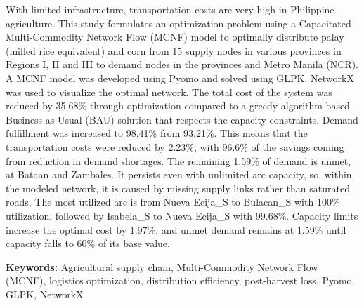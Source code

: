 \documentclass{icsthesis}
\begin{document}
\begin{frontmatter}
\begin{abstractwithpageno}
	With limited infrastructure, transportation costs are very high in Philippine agriculture. This study formulates an optimization problem using a Capacitated Multi-Commodity Network Flow (MCNF) model to optimally distribute palay (milled rice equivalent) and corn from 15 supply nodes in various provinces in Regions I, II and III to demand nodes in the provinces and Metro Manila (NCR). A MCNF model was developed using Pyomo and solved using GLPK. NetworkX was used to visualize the optimal network. The total cost of the system was reduced by 35.68\% through optimization compared to a greedy algorithm based Business-as-Usual (BAU) solution that respects the capacity constraints. Demand fulfillment was increased to 98.41\% from 93.21\%. This means that the transportation costs were reduced by 2.23\%, with 96.6\% of the savings coming from reduction in demand shortages. The remaining 1.59\% of demand is unmet, at Bataan and Zambales. It persists even with unlimited arc capacity, so, within the modeled network, it is caused by missing supply links rather than saturated roads. The most utilized arc is from Nueva Ecija\_S to Bulacan\_S with 100\% utilization, followed by Isabela\_S to Nueva Ecija\_S with 99.68\%. Capacity limits increase the optimal cost by 1.97\%, and unmet demand remains at 1.59\% until capacity falls to 60\% of its base value.

	\noindent\textbf{Keywords:} Agricultural supply chain, Multi-Commodity Network Flow (MCNF), logistics optimization, distribution efficiency, post-harvest loss, Pyomo, GLPK, NetworkX
	\end{abstractwithpageno}
\end{frontmatter}
\end{document}

